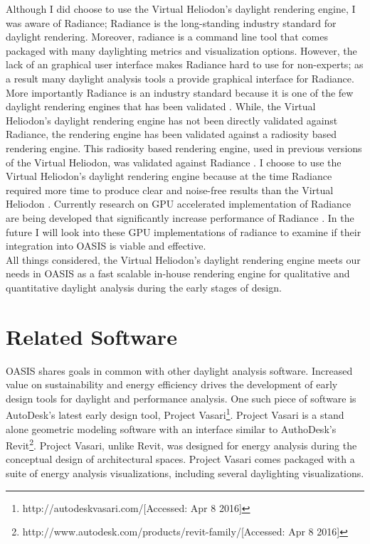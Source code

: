 Although I did choose to use the Virtual Heliodon's daylight rendering engine, I was aware of Radiance; Radiance is the long-standing industry standard for daylight rendering.  Moreover, radiance is a command line tool that comes packaged with many daylighting metrics and visualization options.  However, the lack of an graphical user interface makes Radiance hard to use for non-experts; as a result many daylight analysis tools a provide graphical interface for Radiance.  More importantly Radiance is an industry standard because it is one of the few daylight rendering engines that has been validated \cite{mcneil2013validation}. While, the Virtual Heliodon's daylight rendering engine has not been directly validated against Radiance, the rendering engine has been validated against a radiosity based rendering engine.  This radiosity based rendering engine, used in previous versions of the Virtual Heliodon, was validated against Radiance \cite{sheng2010global}.  I choose to use the Virtual Heliodon's daylight rendering engine because at the time Radiance required more time to produce clear and noise-free results than the Virtual Heliodon \cite{compagnon1997radiance}.  Currently research on GPU accelerated implementation of Radiance are being developed that significantly increase performance of Radiance \cite{zuo2012acceleration}.  In the future I will look into these GPU implementations of radiance to examine if their integration into OASIS is viable and effective.  \\


All things considered, the Virtual Heliodon's daylight rendering engine meets our needs in OASIS as a fast scalable in-house rendering engine for qualitative and quantitative daylight analysis during the early stages of design.

\section{Related Software}


OASIS shares goals in common with other daylight analysis software.  Increased value on sustainability and energy efficiency drives the development of early design tools for daylight and performance analysis.  One such piece of software is AutoDesk's latest early design tool, Project Vasari\footnote{http://autodeskvasari.com/[Accessed: Apr 8 2016]}.  Project Vasari is a stand alone geometric modeling software with an interface similar to AuthoDesk's Revit\footnote{http://www.autodesk.com/products/revit-family/[Accessed: Apr 8 2016]}.  Project Vasari, unlike Revit, was designed for energy analysis during the conceptual design of architectural spaces.  Project Vasari comes packaged with a suite of energy analysis visualizations, including several daylighting visualizations.\\

